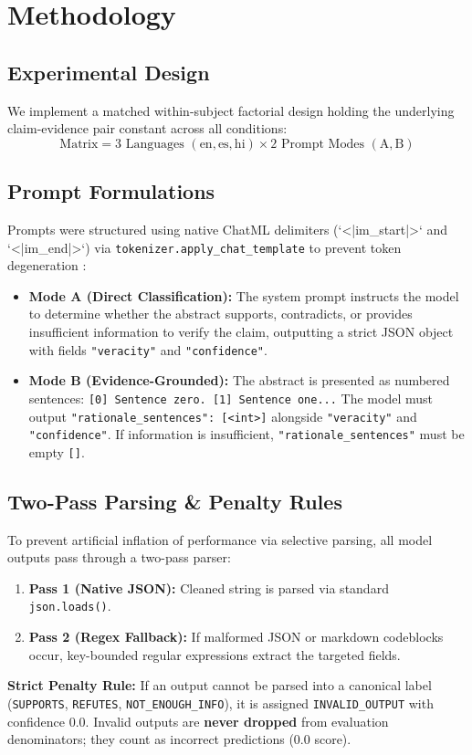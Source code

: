 \documentclass[10pt,twocolumn]{article}
\begin{document}
\section{Methodology}
\label{sec:methodology}

\subsection{Experimental Design}
We implement a matched within-subject factorial design holding the underlying claim-evidence pair constant across all conditions:
\begin{equation}
    \text{Matrix} = 3 \text{ Languages } (\text{en}, \text{es}, \text{hi}) \times 2 \text{ Prompt Modes } (\text{A}, \text{B})
\end{equation}

\subsection{Prompt Formulations}
Prompts were structured using native ChatML delimiters (`<|im_start|>` and `<|im_end|>`) via \texttt{tokenizer.apply\_chat\_template} to prevent token degeneration \cite{yang2024qwen25}:
\begin{itemize}
    \item \textbf{Mode A (Direct Classification):} The system prompt instructs the model to determine whether the abstract supports, contradicts, or provides insufficient information to verify the claim, outputting a strict JSON object with fields \texttt{"veracity"} and \texttt{"confidence"}.
    \item \textbf{Mode B (Evidence-Grounded):} The abstract is presented as numbered sentences: \texttt{[0] Sentence zero. [1] Sentence one...} The model must output \texttt{"rationale\_sentences": [<int>]} alongside \texttt{"veracity"} and \texttt{"confidence"}. If information is insufficient, \texttt{"rationale\_sentences"} must be empty \texttt{[]}.
\end{itemize}

\subsection{Two-Pass Parsing & Penalty Rules}
To prevent artificial inflation of performance via selective parsing, all model outputs pass through a two-pass parser:
\begin{enumerate}
    \item \textbf{Pass 1 (Native JSON):} Cleaned string is parsed via standard \texttt{json.loads()}.
    \item \textbf{Pass 2 (Regex Fallback):} If malformed JSON or markdown codeblocks occur, key-bounded regular expressions extract the targeted fields.
\end{enumerate}
\textbf{Strict Penalty Rule:} If an output cannot be parsed into a canonical label (\texttt{SUPPORTS}, \texttt{REFUTES}, \texttt{NOT\_ENOUGH\_INFO}), it is assigned \texttt{INVALID\_OUTPUT} with confidence $0.0$. Invalid outputs are \textbf{never dropped} from evaluation denominators; they count as incorrect predictions ($0.0$ score).
\end{document}
